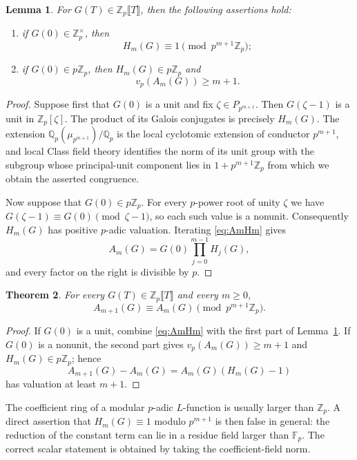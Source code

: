 \documentclass[11pt,table]{amsart}
\newtheorem{theorem}{Theorem}[section]
\newtheorem{lemma}[theorem]{Lemma}
\numberwithin{equation}{section}
\begin{document}
\begin{lemma}\label{lem:cyclotomic-norm-unit}
For $G(T)\in\mathbb Z_p\llbracket T\rrbracket$, then the following assertions hold:
\begin{enumerate}
\item if $G(0)\in\mathbb Z_p^\times$, then
\[
 H_m(G)\equiv1\pmod{p^{m+1}\mathbb Z_p};
\]
\item if $G(0)\in p\mathbb Z_p$, then $H_m(G)\in p\mathbb Z_p$ and 
\[v_p(A_m(G))\geq m+1.
\]
\end{enumerate}
\end{lemma}

\begin{proof}
Suppose first that $G(0)$ is a unit and fix
$\zeta\in P_{p^{m+1}}$.  Then $G(\zeta-1)$ is a unit in
$\mathbb Z_p[\zeta]$.  The product of its Galois conjugates is precisely
$H_m(G)$.  The extension
$\mathbb Q_p(\mu_{p^{m+1}})/\mathbb Q_p$ is the local cyclotomic
extension of conductor $p^{m+1}$, and local Class field theory identifies the norm
of its unit group with the subgroup whose principal-unit component lies in
$1+p^{m+1}\mathbb Z_p$ from which we obtain the asserted congruence.

Now suppose that $G(0)\in p\mathbb Z_p$.  For every $p$-power root of
unity $\zeta$ we have
$G(\zeta-1)\equiv G(0)\pmod{\zeta-1}$, so each such value is a nonunit.
Consequently $H_m(G)$ has positive $p$-adic valuation.  Iterating
\eqref{eq:AmHm} gives
\[
 A_m(G)=G(0)\prod_{j=0}^{m-1}H_j(G),
\]
and every factor on the right is divisible by $p$.
\end{proof}

\begin{theorem}\label{thm:abstract-norm}
For every $G(T)\in\mathbb Z_p\llbracket T\rrbracket$ and every $m\geq0$,
\[
 A_{m+1}(G)\equiv A_m(G)
 \pmod{p^{m+1}\mathbb Z_p}.
\]
\end{theorem}

\begin{proof}
If $G(0)$ is a unit, combine \eqref{eq:AmHm} with the first part of
Lemma~\ref{lem:cyclotomic-norm-unit}.  If $G(0)$ is a nonunit, the second
part gives $v_p(A_m(G))\geq m+1$ and $H_m(G)\in p\mathbb Z_p$; hence
\[
 A_{m+1}(G)-A_m(G)=A_m(G)(H_m(G)-1)
\]
has valuation at least $m+1$.
\end{proof}

The coefficient ring of a modular $p$-adic $L$-function is usually larger
than $\mathbb Z_p$.  A direct assertion that $H_m(G)\equiv1$ modulo
$p^{m+1}$ is then false in general: the reduction of the constant term can
lie in a residue field larger than $\mathbb F_p$.  The correct scalar
statement is obtained by taking the coefficient-field norm.
\end{document}

